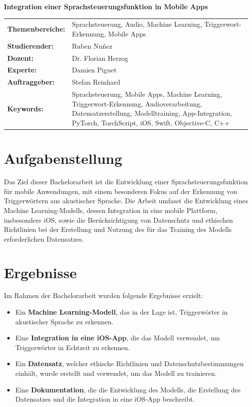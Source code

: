 \documentclass[11pt,a4paper]{article}
\newcommand{\titleformat}{\fontsize{18pt}{22pt}\selectfont}
\newcommand{\bodytextformat}{\fontsize{10pt}{12pt}\selectfont}
\begin{document}
\begin{flushleft}
    {\titleformat\textbf{Integration einer Sprachsteuerungsfunktion in Mobile Apps}}\\[0.5cm]
  \end{flushleft}

\bodytextformat

\noindent
\begin{tabularx}{\linewidth}{@{}p{4cm}X@{}}
    \textbf{Themenbereiche:} & Sprachsteuerung, Audio, Machine Learning, Triggerwort-Erkennung, Mobile Apps \\
    \textbf{Studierender:} & Ruben Nuñez \\
    \textbf{Dozent:} & Dr. Florian Herzog \\
    \textbf{Experte:} & Damien Piguet \\
    \textbf{Auftraggeber:} & Stefan Reinhard \\
    \textbf{Keywords:} & Sprachsteuerung, Mobile Apps, Machine Learning, Triggerwort-Erkennung, Audioverarbeitung, Datensatzerstellung, Modelltraining, App-Integration, PyTorch, TorchScript, iOS, Swift, Objective-C, C++ \\
\end{tabularx}
    

\section{Aufgabenstellung}
Das Ziel dieser Bachelorarbeit ist die Entwicklung einer Sprachsteuerungsfunktion für mobile Anwendungen, mit einem besonderen Fokus auf der Erkennung von Triggerwörtern aus akustischer Sprache. Die Arbeit umfasst die Entwicklung eines Machine Learning-Modells, dessen Integration in eine mobile Plattform, insbesondere iOS, sowie die Berücksichtigung von Datenschutz und ethischen Richtlinien bei der Erstellung und Nutzung des für das Training des Modells erforderlichen Datensatzes.


\section{Ergebnisse}
Im Rahmen der Bachelorarbeit wurden folgende Ergebnisse erzielt:

\begin{itemize}
    \itemsep0em
    \item Ein \textbf{Machine Learning-Modell}, das in der Lage ist, Triggerwörter in akustischer Sprache zu erkennen.
    \item Eine \textbf{Integration in eine iOS-App}, die das Modell verwendet, um Triggerwörter in Echtzeit zu erkennen.
    \item Ein \textbf{Datensatz}, welcher ethische Richtlinien und Datenschutzbestimmungen einhält, wurde erstellt und verwendet, um das Modell zu trainieren.
    \item Eine \textbf{Dokumentation}, die die Entwicklung des Modells, die Erstellung des Datensatzes und die Integration in eine iOS-App beschreibt.
\end{itemize}
\end{document}
